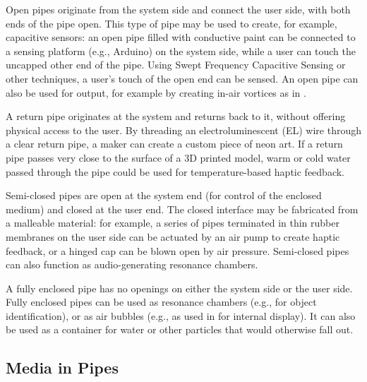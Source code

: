 Open pipes originate from the system side and connect the user side, with both ends of the pipe open. This type of pipe may be used to create, for example, capacitive sensors: an open pipe filled with conductive paint can be connected to a sensing platform (e.g., Arduino) on the system side, while a user can touch the uncapped other end of the pipe.  Using Swept Frequency Capacitive Sensing \cite{Sato-touche} or other techniques, a user's touch of the open end can be sensed.  An open pipe can also be used for output, for example by creating in-air vortices as in \cite{Sodhi-aireal}.

A return pipe originates at the system and returns back to it, without offering physical access to the user.  By threading an electroluminescent (EL) wire through a clear return pipe, a maker can create a custom piece of neon art.  If a return pipe passes very close to the surface of a 3D printed model, warm or cold water passed through the pipe could be used for temperature-based haptic feedback.

Semi-closed pipes are open at the system end (for control of the enclosed medium) and closed at the user end.  The closed interface  may be fabricated from a malleable material: for example, a series of pipes terminated in thin rubber membranes on the user side can be actuated by an air pump to create haptic feedback, or a hinged cap can be blown open by air pressure.  Semi-closed pipes can also function as audio-generating resonance chambers.

A fully enclosed pipe has no openings on either the system side or the user side.  Fully enclosed pipes can be used as resonance chambers (e.g., for object identification), or as air bubbles (e.g., as used in \cite{Willis-printedoptics} for internal display).  It can also be used as a container for water or other particles that would otherwise fall out.


\subsection{Media in Pipes}

